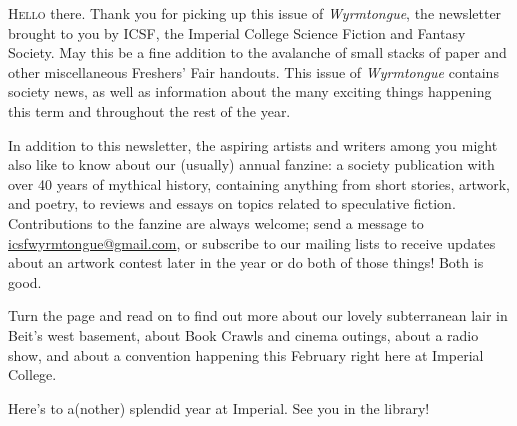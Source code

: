 \lettrine[lines=3]{H}{ello} there. Thank you for picking up this issue of \textit{Wyrmtongue}, the newsletter brought to you by ICSF, the Imperial College Science Fiction and Fantasy Society. May this be a fine addition to the avalanche of small stacks of paper and other miscellaneous Freshers' Fair handouts. This issue of \textit{Wyrmtongue} contains society news, as well as information about the many exciting things happening this term and throughout the rest of the year.

In addition to this newsletter, the aspiring artists and writers among you might also like to know about our (usually) annual fanzine: a society publication with over 40 years of mythical history, containing anything from short stories, artwork, and poetry, to reviews and essays on topics related to speculative fiction. Contributions to the fanzine are always welcome; send a message to \url{icsfwyrmtongue@gmail.com}, or subscribe to our mailing lists to receive updates about an artwork contest later in the year \textemdash{} or do both of those things! Both is good.

Turn the page and read on to find out more about our lovely subterranean lair in Beit's west basement, about Book Crawls and cinema outings, about a radio show, and about a convention happening this February right here at Imperial College.

Here's to a(nother) splendid year at Imperial. See you in the library!
